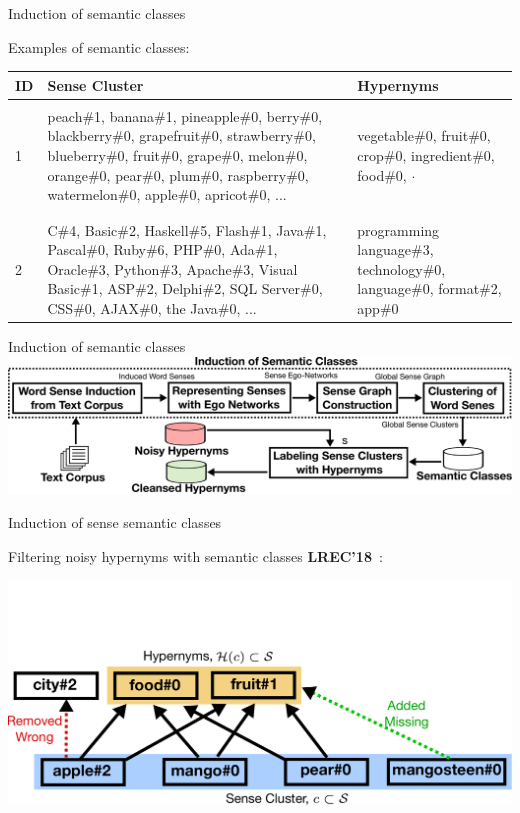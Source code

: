 \begin{frame}{Induction of  semantic classes}

Examples of semantic classes:


\begin{table}[ht]
\centering
\scriptsize
\begin{tabular}{l|p{6cm}|p{3.5cm}} 

\bf ID &  \bf Sense Cluster & \bf Hypernyms \\ \hline
& &  \\
1 & peach\#1, banana\#1, pineapple\#0, berry\#0, blackberry\#0, grapefruit\#0, strawberry\#0, blueberry\#0, fruit\#0, grape\#0, melon\#0, orange\#0, pear\#0, plum\#0, raspberry\#0, watermelon\#0, apple\#0, apricot\#0, ...  &  vegetable\#0, fruit\#0, crop\#0, ingredient\#0, food\#0, $\cdot$ \\ & &  \\ \hline
& &  \\
2  & C\#4, Basic\#2, Haskell\#5, Flash\#1, Java\#1, Pascal\#0, Ruby\#6, PHP\#0, Ada\#1, Oracle\#3, Python\#3, Apache\#3, Visual Basic\#1, ASP\#2, Delphi\#2, SQL Server\#0, CSS\#0, AJAX\#0, the Java\#0, ... & programming language\#3, technology\#0, language\#0, format\#2, app\#0 
\end{tabular}
\end{table}

	
\end{frame}



\begin{frame}{Induction of  semantic classes}
	\includegraphics[width=1.0\textwidth]{outline-semantic-classes}
\end{frame}




\begin{frame}{Induction of sense semantic classes}

Filtering noisy hypernyms with semantic classes \textbf{LREC'18}~\cite{panchenko:2018:SemanticClasses}: 

	\centering \includegraphics[width=1.0\textwidth]{coset}
	
\end{frame}


